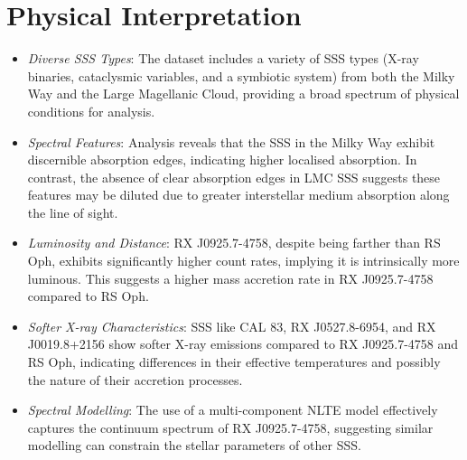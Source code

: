     \section{Physical Interpretation}
    \begin{itemize}
    	\item \textit{Diverse SSS Types}: The dataset includes a variety of SSS types (X-ray binaries, cataclysmic variables, and a symbiotic system) from both the Milky Way and the Large Magellanic Cloud, providing a broad spectrum of physical conditions for analysis.
    	
    	\item \textit{Spectral Features}: Analysis reveals that the SSS in the Milky Way exhibit discernible absorption edges, indicating higher localised absorption. In contrast, the absence of clear absorption edges in LMC SSS suggests these features may be diluted due to greater interstellar medium absorption along the line of sight.
    	
    	\item \textit{Luminosity and Distance}: RX J0925.7-4758, despite being farther than RS Oph, exhibits significantly higher count rates, implying it is intrinsically more luminous. This suggests a higher mass accretion rate in RX J0925.7-4758 compared to RS Oph.
    	
    	\item \textit{Softer X-ray Characteristics}: SSS like CAL 83, RX J0527.8-6954, and RX J0019.8+2156 show softer X-ray emissions compared to RX J0925.7-4758 and RS Oph, indicating differences in their effective temperatures and possibly the nature of their accretion processes.
    	
    	\item \textit{Spectral Modelling}: The use of a multi-component NLTE model effectively captures the continuum spectrum of RX J0925.7-4758, suggesting similar modelling can constrain the stellar parameters of other SSS.
    \end{itemize}
    
